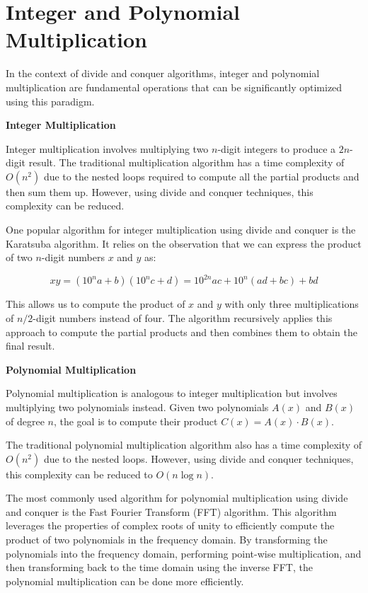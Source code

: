 \documentclass[12pt]{book} %
\begin{document}
\section{Integer and Polynomial Multiplication}
In the context of divide and conquer algorithms, integer and polynomial multiplication are fundamental operations that can be significantly optimized using this paradigm.

\textbf{Integer Multiplication}

Integer multiplication involves multiplying two \(n\)-digit integers to produce a \(2n\)-digit result. The traditional multiplication algorithm has a time complexity of \(O(n^2)\) due to the nested loops required to compute all the partial products and then sum them up. However, using divide and conquer techniques, this complexity can be reduced.

One popular algorithm for integer multiplication using divide and conquer is the Karatsuba algorithm. It relies on the observation that we can express the product of two \(n\)-digit numbers \(x\) and \(y\) as:

\[
xy = (10^n a + b)(10^n c + d) = 10^{2n} ac + 10^n(ad + bc) + bd
\]

This allows us to compute the product of \(x\) and \(y\) with only three multiplications of \(n/2\)-digit numbers instead of four. The algorithm recursively applies this approach to compute the partial products and then combines them to obtain the final result.

\textbf{Polynomial Multiplication}

Polynomial multiplication is analogous to integer multiplication but involves multiplying two polynomials instead. Given two polynomials \(A(x)\) and \(B(x)\) of degree \(n\), the goal is to compute their product \(C(x) = A(x) \cdot B(x)\). 

The traditional polynomial multiplication algorithm also has a time complexity of \(O(n^2)\) due to the nested loops. However, using divide and conquer techniques, this complexity can be reduced to \(O(n \log n)\).

The most commonly used algorithm for polynomial multiplication using divide and conquer is the Fast Fourier Transform (FFT) algorithm. This algorithm leverages the properties of complex roots of unity to efficiently compute the product of two polynomials in the frequency domain. By transforming the polynomials into the frequency domain, performing point-wise multiplication, and then transforming back to the time domain using the inverse FFT, the polynomial multiplication can be done more efficiently.
\end{document}
